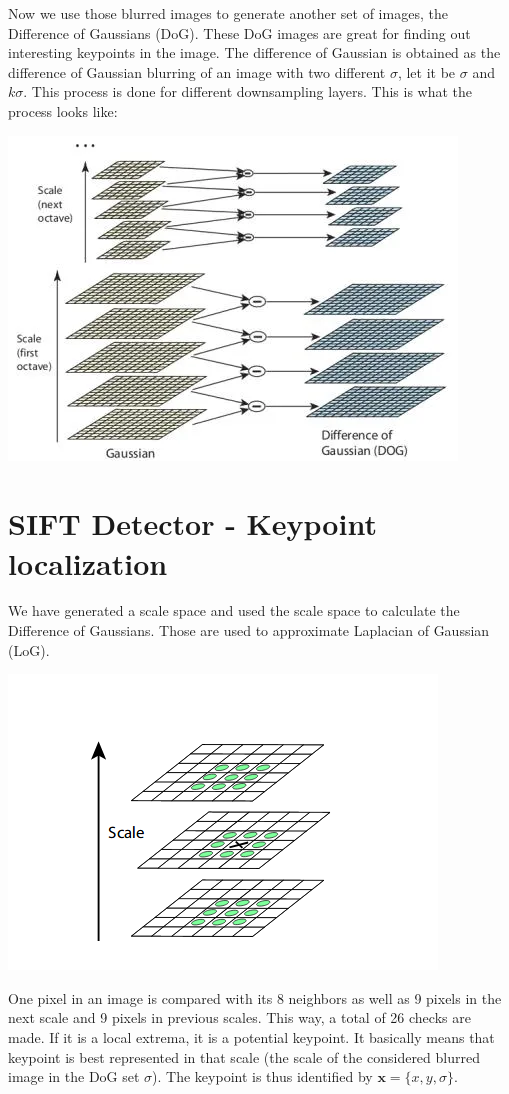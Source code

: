 \documentclass{article}
\begin{document}
Now we use those blurred images to generate another set of images, the Difference of Gaussians (DoG). These DoG images are great for finding out interesting keypoints in the image. The difference of Gaussian is obtained as the difference of Gaussian blurring of an image with two different $\sigma$, let it be $\sigma$ and $k\sigma$. This process is done for different downsampling layers. This is what the process looks like:

\begin{center}
    \includegraphics[width=.6\linewidth]{images/octave_dog.png}
\end{center}

\section*{SIFT Detector - Keypoint localization}

We have generated a scale space and used the scale space to calculate the Difference of Gaussians. Those are used to approximate Laplacian of Gaussian (LoG).

\begin{center}
    \includegraphics[width=.6\linewidth]{images/sift_keypoint_localization.png}
\end{center}

One pixel in an image is compared with its 8 neighbors as well as 9 pixels in the next scale and 9 pixels in previous scales. This way, a total of 26 checks are made. If it is a local extrema, it is a potential keypoint. It basically means that keypoint is best represented in that scale (the scale of the considered blurred image in the DoG set $\sigma$). The keypoint is thus identified by $\textbf{x} = \{x, y, \sigma\}$.
\end{document}
